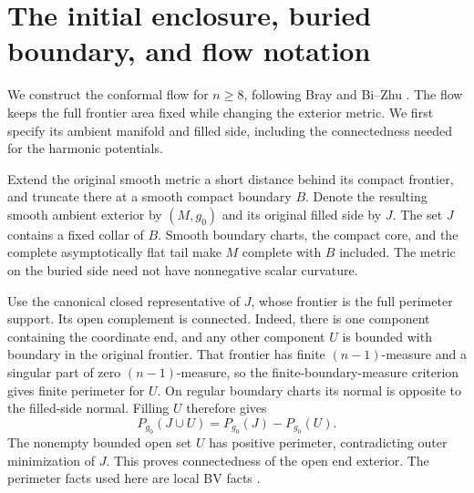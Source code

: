\section{The initial enclosure, buried boundary, and flow notation}
\label{sec:rpi:flow-localization}

We construct the conformal flow for $n\ge8$, following Bray and
Bi--Zhu \cite{Bray2001,BiZhu2026v2}. The flow keeps the full frontier
area fixed while changing the exterior metric. We first specify its
ambient manifold and filled side, including the connectedness needed
for the harmonic potentials.

Extend the original smooth metric a short distance behind its compact
frontier, and truncate there at a smooth compact boundary $B$. Denote
the resulting smooth ambient exterior by $(M,g_0)$ and its original
filled side by $J$. The set $J$ contains a fixed collar of $B$.
Smooth boundary charts, the compact core, and the complete
asymptotically flat tail make $M$ complete with $B$ included. The
metric on the buried side need not have nonnegative scalar curvature.

Use the canonical closed representative of $J$, whose frontier is the
full perimeter support. Its open complement is connected. Indeed,
there is one component containing the coordinate end, and any other
component $U$ is bounded with boundary in the original frontier.
That frontier has finite $(n-1)$-measure and a singular part of zero
$(n-1)$-measure, so the finite-boundary-measure criterion gives finite
perimeter for $U$. On regular boundary charts its normal is opposite
to the filled-side normal. Filling $U$ therefore gives
\[
 P_{g_0}(J\cup U)=P_{g_0}(J)-P_{g_0}(U).
\]
The nonempty bounded open set $U$ has positive perimeter, contradicting
outer minimization of $J$. This proves connectedness of the open end
exterior. The perimeter facts used here are local BV facts
\cite{AmbrosioFuscoPallara2000,Maggi2012}.

